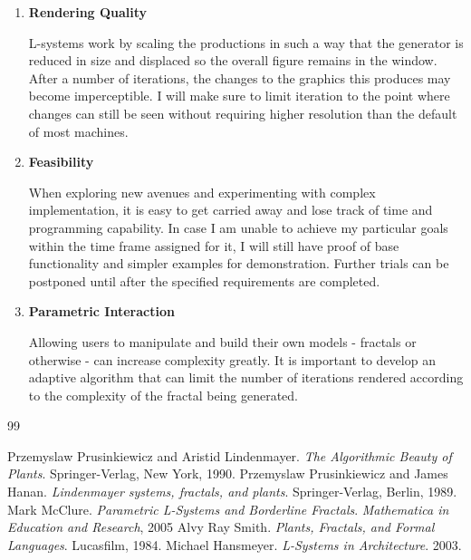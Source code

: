\documentclass[]{plan}
\begin{document}
\begin{enumerate}
    \item \textsf{\textbf{\large{Rendering Quality}}} 

    L-systems work by scaling the productions in such a way that the generator is reduced in size and displaced so the overall figure remains in the window. After a number of iterations, the changes to the graphics this produces may become imperceptible. I will make sure to limit iteration to the point where changes can still be seen without requiring higher resolution than the default of most machines. 
    
    \item \textsf{\textbf{\large{Feasibility}}}

    When exploring new avenues and experimenting with complex implementation, it is easy to get carried away and lose track of time and programming capability. In case I am unable to achieve my particular goals within the time frame assigned for it, I will still have proof of base functionality and simpler examples for demonstration. Further trials can be postponed until after the specified requirements are completed.
    
    \item \textsf{\textbf{\large{Parametric Interaction}}}

    Allowing users to manipulate and build their own models - fractals or otherwise - can increase complexity greatly. It is important to develop an adaptive algorithm that can limit the number of iterations rendered according to the complexity of the fractal being generated.
    
\end{enumerate}



\newpage
\begin{thebibliography}{99}
 Przemyslaw Prusinkiewicz and Aristid Lindenmayer. \emph{The Algorithmic Beauty of Plants}.  Springer-Verlag, New York, 1990.
 Przemyslaw Prusinkiewicz and James Hanan. \emph{Lindenmayer systems, fractals, and plants}. Springer-Verlag, Berlin, 1989.
 Mark McClure. \emph{Parametric L-Systems and Borderline Fractals}. \emph{Mathematica in Education and Research}, 2005 
 Alvy Ray Smith. \emph{Plants, Fractals, and Formal Languages}. Lucasfilm, 1984.
 Michael Hansmeyer. \emph{L-Systems in Architecture}. 2003.
\end{thebibliography}
\label{endpage}
\end{document}
